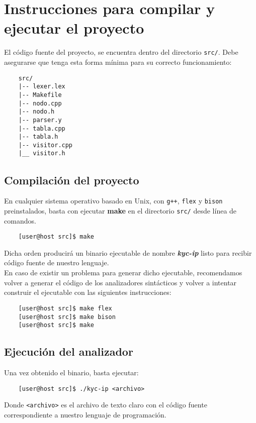 \documentclass[12pt]{article}
\begin{document}
\section{Instrucciones para compilar y ejecutar el proyecto}\label{sec:s}

El código fuente del proyecto, se encuentra dentro del directorio \texttt{src/}. Debe asegurarse
que tenga esta forma mínima para su correcto funcionamiento:
\begin{verbatim}
    src/
    |-- lexer.lex
    |-- Makefile
    |-- nodo.cpp
    |-- nodo.h
    |-- parser.y
    |-- tabla.cpp
    |-- tabla.h
    |-- visitor.cpp
    |__ visitor.h

\end{verbatim}

\subsection{Compilación del proyecto}

En cualquier sistema operativo basado en Unix, con \texttt{g++}, \texttt{flex} y \texttt{bison} preinstalados, basta con ejecutar \textbf{make} en el directorio \texttt{src/} desde línea de comandos.

\begin{verbatim}
    [user@host src]$ make
\end{verbatim}
Dicha orden producirá un binario ejecutable de nombre \textit{\textbf{kyc-ip}} listo para recibir código fuente de nuestro lenguaje.\\
En caso de existir un problema para generar dicho ejecutable, recomendamos volver a generar el código de los analizadores sintácticos y volver a intentar construir el ejecutable con las siguientes instrucciones:
\begin{verbatim}
    [user@host src]$ make flex
    [user@host src]$ make bison
    [user@host src]$ make
\end{verbatim}

\subsection{Ejecución del analizador} 

Una vez obtenido el binario, basta ejecutar:
\begin{verbatim}
    [user@host src]$ ./kyc-ip <archivo>
\end{verbatim}
Donde \texttt{<archivo>} es el archivo de texto claro con el código fuente correspondiente a nuestro lenguaje de programación.
\end{document}
